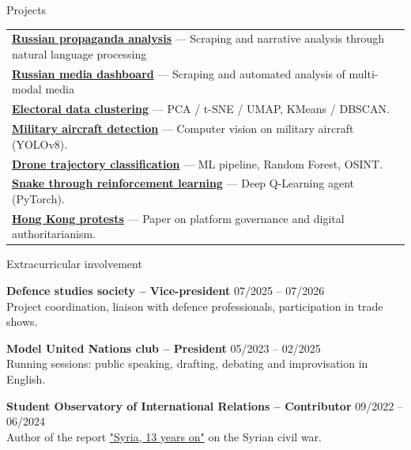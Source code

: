 \documentclass{resume}
\begin{document}
\begin{rSection}{Projects \vspace{-0.1em}
}

\begin{tabular}{ @{} l @{} }

\href{https://github.com/Romain-Jaffuel/Russian-Propaganda-Analysis-Ukraina.ru}{\textbf{Russian propaganda analysis}} --- Scraping and narrative analysis through natural language processing
\\
\href{https://github.com/Romain-Jaffuel/Russian-Media-Monitor}{\textbf{Russian media dashboard}} --- Scraping and automated analysis of multi-modal media
\\
\href{https://github.com/Romain-Jaffuel/ElectionClustering}{\textbf{Electoral data clustering}} --- PCA / t-SNE / UMAP, KMeans / DBSCAN.
\\
\href{https://github.com/Romain-Jaffuel/Military-Aircraft-Detection}{\textbf{Military aircraft detection}} --- Computer vision on military aircraft (YOLOv8).
\\
\href{https://github.com/Romain-Jaffuel/Portfolio/tree/master/ClassificationDroneUA}{\textbf{Drone trajectory classification}} --- ML pipeline, Random Forest, OSINT.
\\
\href{https://github.com/Romain-Jaffuel/Snake-AI}{\textbf{Snake through reinforcement learning}} --- Deep Q-Learning agent (PyTorch).
\\
\href{https://romain-jaffuel.github.io/assets/docs/hong-kong-2019-digital-space.pdf}{\textbf{Hong Kong protests}} --- Paper on platform governance and digital authoritarianism.
\\

\end{tabular}

\end{rSection}


\begin{rSection}{Extracurricular involvement}

{\bf Defence studies society -- Vice-president} \hfill {\small 07/2025 -- 07/2026}
\\
Project coordination, liaison with defence professionals, participation in trade shows.

{\bf Model United Nations club -- President} \hfill {\small 05/2023 -- 02/2025}
\\
Running sessions: public speaking, drafting, debating and improvisation in English.

{\bf Student Observatory of International Relations -- Contributor} \hfill {\small 09/2022 -- 06/2024}
\\
Author of the report \href{https://romain-jaffuel.github.io/assets/docs/syria-civil-war-analysis.pdf}{"Syria, 13 years on"} on the Syrian civil war.

\end{rSection}
\end{document}
